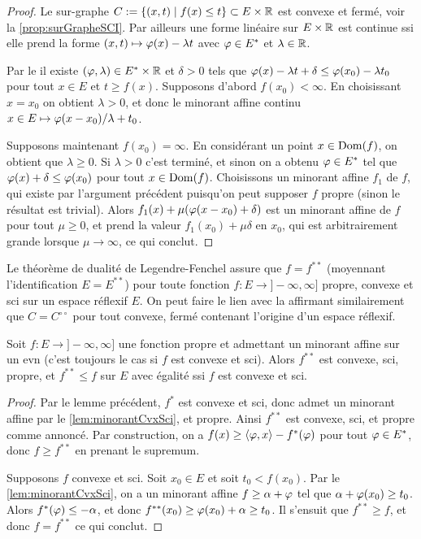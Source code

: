 \begin{proof}
	Le sur-graphe $C := \{(x,t) \mid f(x) \leq t\} \subset E \times \mathbb{R}$ est convexe et fermé, voir la \cref{prop:surGrapheSCI}. 
	Par ailleurs une forme linéaire sur $E \times \mathbb{R}$ est continue ssi elle prend la forme $(x,t) \mapsto \varphi(x) - \lambda t$ avec $\varphi \in E^*$ et $\lambda \in \mathbb{R}$. 

	Par le  il existe $(\varphi,\lambda) \in E^* \times \mathbb{R}$ et $\delta>0$ tels que $\varphi(x)-\lambda t +\delta \leq  \varphi(x_0) - \lambda t_0$ pour tout $x\in E$ et $t \geq f(x)$. 
	Supposons d'abord $f(x_0) < \infty$.  
	En choisissant $x=x_0$ on obtient $\lambda >0$, et donc le minorant affine continu $x\in E \mapsto \varphi(x-x_0)/\lambda +t_0$.
		
	Supposons maintenant $f(x_0) = \infty$. En considérant un point $x\in \operatorname{Dom}(f)$, on obtient que $\lambda \geq 0$. Si $\lambda>0$ c'est terminé, et sinon on a obtenu $\varphi \in E^*$ tel que $\varphi(x) +\delta \leq \varphi(x_0)$ pour tout $x\in \operatorname{Dom}(f)$. Choisissons un minorant affine $f_1$ de $f$, qui existe par l'argument précédent puisqu'on peut supposer $f$ propre (sinon le résultat est trivial). 
	Alors $f_1(x) + \mu (\varphi(x-x_0)+\delta)$ est un minorant affine de $f$ pour tout $\mu \geq 0$, et prend la valeur $f_1(x_0)+\mu \delta$ en $x_0$, qui est arbitrairement grande lorsque $\mu \to \infty$, ce qui conclut. 
\end{proof}


Le théorème de dualité de Legendre-Fenchel assure que $f = f^{**}$ (moyennant l'identification $E=E^{**}$) pour toute fonction $f : E \to ]-\infty,\infty]$ propre, convexe et sci sur un espace réflexif $E$. On peut faire le lien avec la  affirmant similairement que $C = C^{\circ\circ}$ pour tout convexe, fermé contenant l'origine d'un espace réflexif.

\begin{theorem}
\label{th:LegendreFenchel}
%
	Soit $f : E \to ]-\infty,\infty]$ une fonction propre et admettant un minorant affine sur un evn (c'est toujours le cas si $f$ est convexe et sci). 
	Alors $f^{**}$ est convexe, sci, propre, et $f^{**} \leq f$ sur $E$ avec égalité ssi $f$ est convexe et sci. 
\end{theorem}

\begin{proof}
	Par le lemme précédent, $f^*$ est convexe et sci, donc admet un minorant affine par le \cref{lem:minorantCvxSci}, et propre. 
	Ainsi $f^{**}$ est convexe, sci, et propre comme annoncé. 
	Par construction, on a $f(x) \geq \langle\varphi,x\rangle - f^*(\varphi)$ pour tout $\varphi \in E^*$, donc $f \geq f^{**}$ en prenant le supremum. 
	
	Supposons $f$ convexe et sci. Soit $x_0 \in E$ et soit $t_0 < f(x_0)$. Par le \cref{lem:minorantCvxSci}, on a un minorant affine $f \geq \alpha + \varphi$ tel que $\alpha + \varphi(x_0) \geq t_0$. Alors $f^*(\varphi) \leq - \alpha$, et donc $f^{**} (x_0) \geq \varphi(x_0) + \alpha \geq t_0$. Il s'ensuit que $f^{**} \geq f$, et donc $f=f^{**}$ ce qui conclut.
\end{proof}

